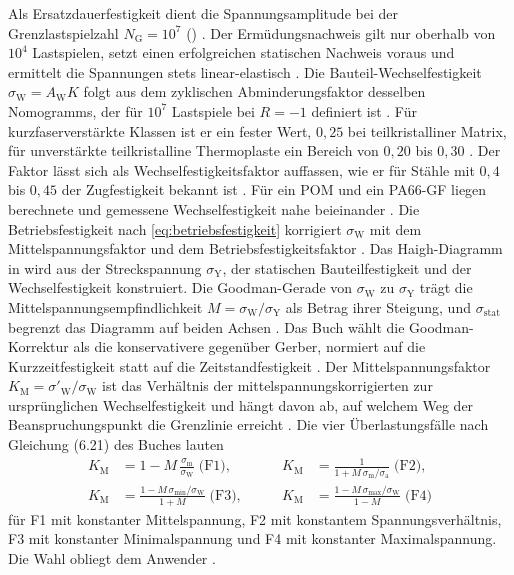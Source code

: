 Als Ersatzdauerfestigkeit dient die Spannungsamplitude bei der Grenzlastspielzahl $N_{\mathrm{G}} = 10^{7}$ () \cite[S.~328]{Sto18}. Der Ermüdungsnachweis gilt nur oberhalb von $10^{4}$ Lastspielen, setzt einen erfolgreichen statischen Nachweis voraus und ermittelt die Spannungen stets linear-elastisch \cite[S.~361 bis 362]{Sto18}. Die Bauteil-Wechselfestigkeit $\sigma_{\mathrm{W}} = A_{\mathrm{W}} K$ folgt aus dem zyklischen Abminderungsfaktor desselben Nomogramms, der für $10^{7}$ Lastspiele bei $R = -1$ definiert ist \cite[S.~362 bis 363]{Sto18}. Für kurzfaserverstärkte Klassen ist er ein fester Wert, $0{,}25$ bei teilkristalliner Matrix, für unverstärkte teilkristalline Thermoplaste ein Bereich von $0{,}20$ bis $0{,}30$ \cite[S.~362 bis 363]{Sto18}. Der Faktor lässt sich als Wechselfestigkeitsfaktor auffassen, wie er für Stähle mit $0{,}4$ bis $0{,}45$ der Zugfestigkeit bekannt ist \cite[S.~363]{Sto18}. Für ein POM und ein PA66-GF liegen berechnete und gemessene Wechselfestigkeit nahe beieinander \cite[S.~363 bis 364]{Sto18}. Die Betriebsfestigkeit nach \eqref{eq:betriebsfestigkeit} korrigiert $\sigma_{\mathrm{W}}$ mit dem Mittelspannungsfaktor und dem Betriebsfestigkeitsfaktor \cite[S.~360]{Sto18}. Das Haigh-Diagramm in  wird aus der Streckspannung $\sigma_{\mathrm{Y}}$, der statischen Bauteilfestigkeit und der Wechselfestigkeit konstruiert. Die Goodman-Gerade von $\sigma_{\mathrm{W}}$ zu $\sigma_{\mathrm{Y}}$ trägt die Mittelspannungsempfindlichkeit $M = \sigma_{\mathrm{W}}/\sigma_{\mathrm{Y}}$ als Betrag ihrer Steigung, und $\sigma_{\mathrm{stat}}$ begrenzt das Diagramm auf beiden Achsen \cite[S.~364 bis 365]{Sto18}. Das Buch wählt die Goodman-Korrektur als die konservativere gegenüber Gerber, normiert auf die Kurzzeitfestigkeit statt auf die Zeitstandfestigkeit \cite[S.~328 bis 329]{Sto18}. Der Mittelspannungsfaktor $K_{\mathrm{M}} = \sigma'_{\mathrm{W}}/\sigma_{\mathrm{W}}$ ist das Verhältnis der mittelspannungskorrigierten zur ursprünglichen Wechselfestigkeit und hängt davon ab, auf welchem Weg der Beanspruchungspunkt die Grenzlinie erreicht \cite[S.~366 bis 367]{Sto18}. Die vier Überlastungsfälle nach Gleichung (6.21) des Buches lauten \cite[S.~367 bis 368]{Sto18}
\begin{equation}
    \begin{aligned}
        K_{\mathrm{M}} & = 1 - M\,\frac{\sigma_{\mathrm{m}}}{\sigma_{\mathrm{W}}} \;\text{(F1)} , \qquad         &
        K_{\mathrm{M}} & = \frac{1}{1 + M\,\sigma_{\mathrm{m}}/\sigma_{\mathrm{a}}} \;\text{(F2)} ,                \\
        K_{\mathrm{M}} & = \frac{1 - M\,\sigma_{\mathrm{min}}/\sigma_{\mathrm{W}}}{1 + M} \;\text{(F3)} , \qquad &
        K_{\mathrm{M}} & = \frac{1 - M\,\sigma_{\mathrm{max}}/\sigma_{\mathrm{W}}}{1 - M} \;\text{(F4)}
    \end{aligned}
    \label{eq:k_m_ueberlastung}
\end{equation}
für F1 mit konstanter Mittelspannung, F2 mit konstantem Spannungsverhältnis, F3 mit konstanter Minimalspannung und F4 mit konstanter Maximalspannung. Die Wahl obliegt dem Anwender \cite[S.~366 bis 367]{Sto18}.

